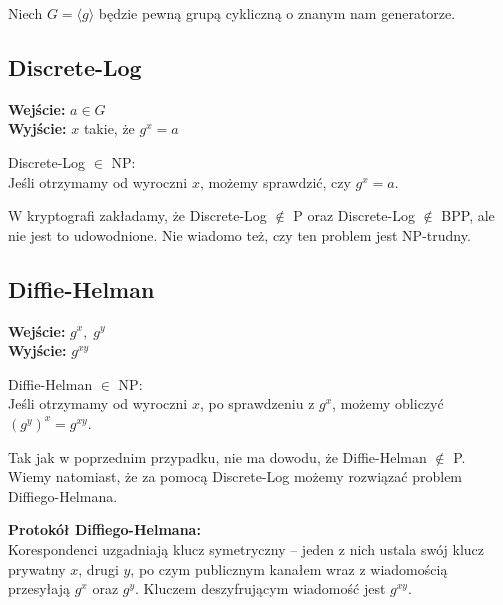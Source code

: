 Niech \( G = \langle g \rangle \) będzie pewną grupą cykliczną o znanym nam generatorze.

\subsection{Discrete-Log}
\textbf{Wejście:} \( a \in G \) \\
\textbf{Wyjście:} \( x \) takie, że \( g^x = a \)

Discrete-Log \( \in \) NP: \\
Jeśli otrzymamy od wyroczni \( x \), możemy sprawdzić, czy \( g^x = a \).

W kryptografi zakładamy, że Discrete-Log \( \notin \) P oraz Discrete-Log \( \notin \) BPP, ale nie jest to udowodnione. Nie wiadomo też, czy ten problem jest NP-trudny.

\subsection{Diffie-Helman}
\textbf{Wejście:} \( g^x,\; g^y \) \\
\textbf{Wyjście:} \( g^{xy} \)

Diffie-Helman \( \in \) NP: \\
Jeśli otrzymamy od wyroczni \( x \), po sprawdzeniu z \( g^x \), możemy obliczyć \( (g^{y})^x = g^{xy} \).

Tak jak w poprzednim przypadku, nie ma dowodu, że Diffie-Helman \( \notin \) P. Wiemy natomiast, że za pomocą Discrete-Log możemy rozwiązać problem Diffiego-Helmana.

\textbf{Protokół Diffiego-Helmana:} \\
Korespondenci uzgadniają klucz symetryczny – jeden z nich ustala swój klucz prywatny \( x \), drugi \( y \), po czym publicznym kanałem wraz z wiadomością przesyłają \( g^x \) oraz \( g^y \). Kluczem deszyfrującym wiadomość jest \( g^{xy} \).